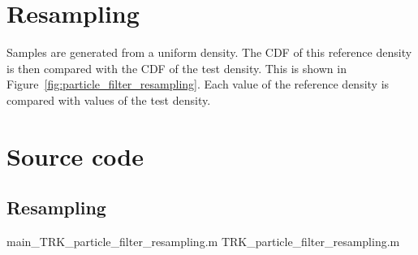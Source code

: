 \section{Resampling}
Samples are generated from a uniform density.  The CDF of this reference density is then compared with the CDF of the test density.  This is shown in Figure~\ref{fig:particle_filter_resampling}.  Each value of the reference density is compared with values of the test density.  

\newpage
\tiny
\appendix
\section{Source code}
\subsection{Resampling}
						{main_TRK_particle_filter_resampling.m}
								{TRK_particle_filter_resampling.m}

\normalsize


